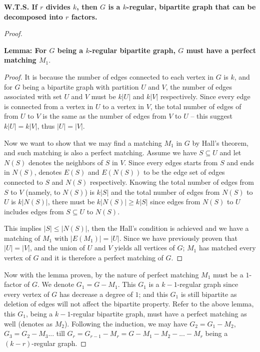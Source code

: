 \documentclass[11pt]{article}
\begin{document}
\noindent\textbf{W.T.S. If $r$ divides $k$, then $G$ is a $k$-regular, bipartite graph that can be decomposed into $r$ factors.}

\begin{proof}
    \leavevmode\newline


    \begin{adjustwidth}{1cm}{}

    \textbf{Lemma: For $G$ being a $k$-regular bipartite graph, $G$ must have a perfect matching $M_1$}.\newline

    \begin{proof}
        It is because the number of edges connected to each vertex in $G$ is $k$, and for $G$ being a bipartite graph with partition $U$ and $V$, the number of edges associated with set $U$ and $V$ must be $k|U|$ and $k|V|$ respectively. Since every edge is connected from a vertex in $U$ to a vertex in $V$, the total number of edges of from $U$ to $V$ is the same as the number of edges from $V$ to $U$ -- this suggest $k|U| = k|V|$, thus $|U| = |V|$.

        Now we want to show that we may find a matching $M_1$ in $G$ by Hall's theorem, and such matching is also a perfect matching. Assume we have $S \subseteq U$ and let $N(S)$ denotes the neighbors of $S$ in $V$. Since every edges starts from $S$ and ends in $N(S)$, denotes $E(S)$ and $E(N(S))$ to be the edge set of edges connected to $S$ and $N(S)$ respectively. Knowing the total number of edges from $S$ to $V$ (namely, to $N(S)$) is $k|S|$ and the total number of edges from $N(S)$ to $U$ is $k|N(S)|$, there must be $k|N(S)| \geq k|S|$ since edges from $N(S)$ to $U$ includes edges from $S \subseteq U$ to $N(S)$.

        This implies $|S| \leq |N(S)|$, then the Hall's condition is achieved and we have a matching of $M_1$ with $|E(M_1)| = |U|$. Since we have previously proven that $|U| = |V|$, and the union of $U$ and $V$ yields all vertices of $G$; $M_1$ has matched every vertex of $G$ and it is therefore a perfect matching of $G$.\newline
    \end{proof}
\end{adjustwidth}

Now with the lemma proven, by the nature of perfect matching $M_1$ must be a $1$-factor of $G$. We denote $G_1 = G - M_1$. This $G_1$ is a $k-1$-regular graph since every vertex of $G$ has decrease a degree of $1$; and this $G_1$ is still bipartite as deletion of edges will not affect the bipartite property. Refer to the above lemma, this $G_1$, being a $k-1$-regular bipartite graph, must have a perfect matching as well (denotes as $M_2$). Following the induction, we may have $G_2 = G_1 - M_2$, $G_3 = G_2 - M_3$... till $G_r = G_{r-1} - M_r = G - M_1 - M_2 - ... - M_r$ being a $(k-r)$-regular graph.\newline


\end{proof}
\end{document}
